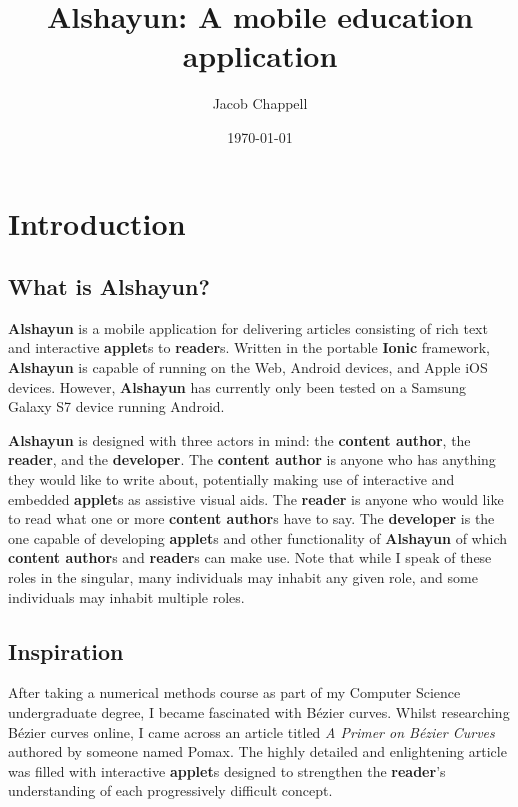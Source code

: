 \documentclass[12pt]{report}
\begin{document}
\title{Alshayun: A mobile education application}
\author{Jacob Chappell}
\date{\today}
\maketitle

\tableofcontents
\listoffigures


\chapter{Introduction}

    \section{What is Alshayun?}

\textbf{Alshayun} is a mobile application for delivering articles consisting of
rich text and interactive \textbf{applet}s to \textbf{reader}s. Written in the
portable \textbf{Ionic} framework, \textbf{Alshayun} is capable of running on
the Web, Android devices, and Apple iOS devices. However, \textbf{Alshayun} has
currently only been tested on a Samsung Galaxy S7 device running Android.

\textbf{Alshayun} is designed with three actors in mind: the \textbf{content
author}, the \textbf{reader}, and the \textbf{developer}. The \textbf{content
author} is anyone who has anything they would like to write about, potentially
making use of interactive and embedded \textbf{applet}s as assistive visual
aids. The \textbf{reader} is anyone who would like to read what one or more
\textbf{content author}s have to say. The \textbf{developer} is the one capable of
developing \textbf{applet}s and other functionality of \textbf{Alshayun} of
which \textbf{content author}s and \textbf{reader}s can make use. Note that
while I speak of these roles in the singular, many individuals may inhabit any
given role, and some individuals may inhabit multiple roles.

    \section{Inspiration}

After taking a numerical methods course as part of my Computer Science
undergraduate degree, I became fascinated with Bézier curves. Whilst researching
Bézier curves online, I came across an article titled \textit{A Primer on Bézier
Curves} \cite{pomax} authored by someone named Pomax. The highly detailed and
enlightening article was filled with interactive \textbf{applet}s designed to
strengthen the \textbf{reader}'s understanding of each progressively difficult
concept.
\end{document}
